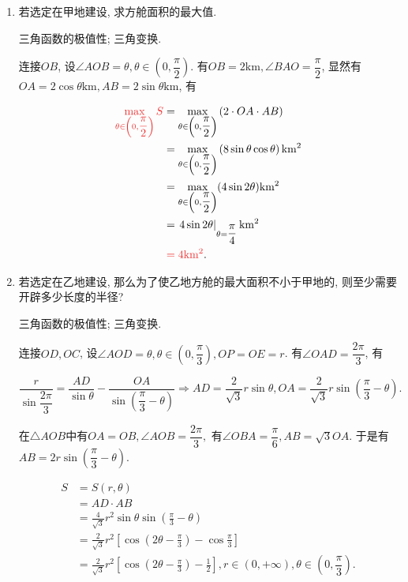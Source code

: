\documentclass[8pt]{article}
\begin{document}
			\begin{enumerate}[label=\defmath{(\arabic*)}]
				\item 若选定在甲地建设, 求方舱面积的最大值. 

					三角函数的极值性; 三角变换.

					连接\(OB\), 设\(\angle AOB = \theta, \theta \in \left(0, \dfrac{\pi}{2}\right)\). 有\(OB = 2\mathrm{km}, \angle BAO = \dfrac{\pi}{2}\), 显然有\(OA = 2\cos \theta \mathrm{km}, AB = 2\sin \theta \mathrm{km}\), 有

					\begin{align*}
					\ansmath{\max_{\theta \in \left(0, \dfrac{\pi}{2}\right)}S} &= \max_{\theta \in \left(0, \dfrac{\pi}{2}\right)} \left(2 \cdot OA \cdot AB\right)\\
					&= \max_{\theta \in \left(0, \dfrac{\pi}{2}\right)} \left(8 \sin \theta \cos \theta\right) \mathrm{km^2}\\
					&= \max_{\theta \in \left(0, \dfrac{\pi}{2}\right)}(4 \sin 2 \theta) \mathrm{km^2}\\
					&= \at{4 \sin 2 \theta}{\theta = \dfrac{\pi}{4}}\mathrm{km^2}\\
					&\ansmath{= 4 \mathrm{km^2}}.
					\end{align*}

				\item 若选定在乙地建设, 那么为了使乙地方舱的最大面积不小于甲地的, 则至少需要开辟多少长度的半径? 

					三角函数的极值性; 三角变换.

					连接\(OD, OC\), 设\(\angle AOD = \theta, \theta \in \left(0, \dfrac{\pi}{3}\right), OP=OE=r\). 有\(\angle OAD = \dfrac{2\pi}{3}\), 有

					\[
						\frac{r}{\sin\dfrac{2\pi}{3}} = \dfrac{AD}{\sin \theta} - \dfrac{OA}{\sin \left(\dfrac{\pi}{3} - \theta\right)} \Rightarrow AD = \dfrac{2}{\sqrt{3}}r\sin \theta, OA = \dfrac{2}{\sqrt{3}}r\sin \left(\dfrac{\pi}{3} - \theta\right).
					\]

					在\(\triangle AOB\)中有\(OA=OB, \angle AOB = \dfrac{2\pi}{3},\) 有\(\angle OBA = \dfrac{\pi}{6}, AB = \sqrt{3} OA\). 于是有$AB=2r\sin \left(\dfrac{\pi}{3}-\theta\right)$.

					\begin{align*}
						S &= S(r, \theta)\\
						  &= AD \cdot AB\\
						  &= \frac{4}{\sqrt{3}} r^2 \sin\theta \sin\left(\frac{\pi}{3} - \theta\right)\\
						  &= \frac{2}{\sqrt{3}} r^2 \left[\cos \left(2\theta - \frac{\pi}{3}\right) - \cos \frac{\pi}{3}\right]\\
						  &= \frac{2}{\sqrt{3}} r^2 \left[\cos \left(2\theta - \frac{\pi}{3}\right) - \frac{1}{2}\right], r \in (0, +\infty), \theta \in \left(0, \dfrac{\pi}{3}\right).
					\end{align*}


\end{enumerate}
\end{document}
